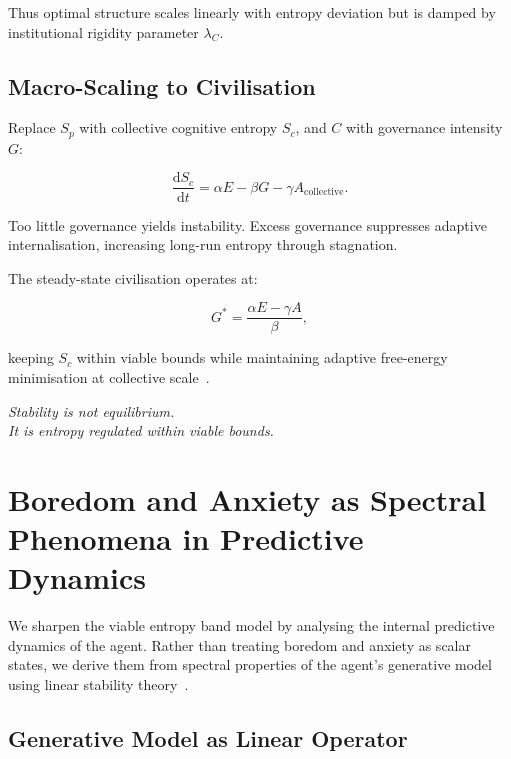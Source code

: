 \documentclass[12pt,a4paper]{article}
\theoremstyle{definition}
\newcommand{\ddt}[1]{\frac{\mathrm{d}#1}{\mathrm{d}t}}
\begin{document}
Thus optimal structure scales linearly with
entropy deviation but is damped by institutional rigidity parameter $\lambda_C$.

\subsection{Macro-Scaling to Civilisation}

Replace $S_p$ with collective cognitive entropy $S_c$,
and $C$ with governance intensity $G$:

\begin{equation}
  \ddt{S_c} =
  \alpha E - \beta G - \gamma A_{\mathrm{collective}}.
\end{equation}

Too little governance yields instability.
Excess governance suppresses adaptive internalisation,
increasing long-run entropy through stagnation.

The steady-state civilisation operates at:

\begin{equation}
  G^* =
  \frac{\alpha E - \gamma A}{\beta},
\end{equation}

keeping $S_c$ within viable bounds
while maintaining adaptive free-energy minimisation
at collective scale~\citep{friston2023}.

\medskip
\begin{center}
  \itshape
  Stability is not equilibrium.\\
  It is entropy regulated within viable bounds.
\end{center}

\section{Boredom and Anxiety as Spectral Phenomena in Predictive Dynamics}
\label{sec:spectral_affect}

We sharpen the viable entropy band model by analysing
the internal predictive dynamics of the agent.
Rather than treating boredom and anxiety as scalar states,
we derive them from spectral properties of the agent’s
generative model using linear stability theory~\citep{strogatz2018}.

\subsection{Generative Model as Linear Operator}
\end{document}
